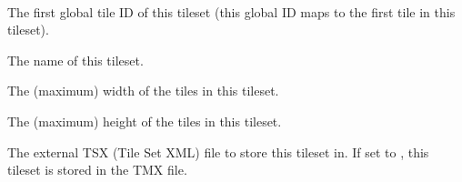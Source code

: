 \documentclass[letterpaper,10pt,english]{sphinxmanual}
\begin{document}

\begin{fulllineitems}
\label{index:tmx.Tileset}~

\begin{fulllineitems}
\label{index:tmx.Tileset.firstgid}
The first global tile ID of this tileset (this global ID maps to
the first tile in this tileset).

\end{fulllineitems}


\begin{fulllineitems}
\label{index:tmx.Tileset.name}
The name of this tileset.

\end{fulllineitems}


\begin{fulllineitems}
\label{index:tmx.Tileset.tilewidth}
The (maximum) width of the tiles in this tileset.

\end{fulllineitems}


\begin{fulllineitems}
\label{index:tmx.Tileset.tileheight}
The (maximum) height of the tiles in this tileset.

\end{fulllineitems}


\begin{fulllineitems}
\label{index:tmx.Tileset.source}
The external TSX (Tile Set XML) file to store this tileset in.
If set to , this tileset is stored in the TMX file.

\end{fulllineitems}


\end{fulllineitems}
\end{document}
